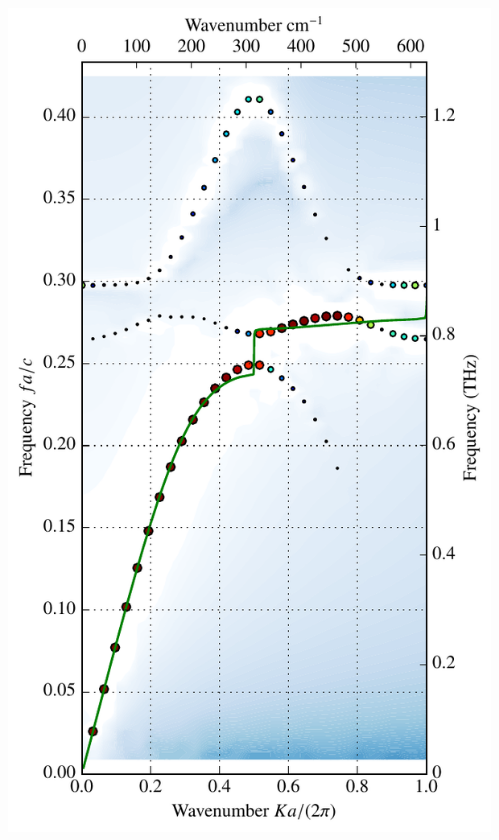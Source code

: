 \documentclass[t]{beamer} \usepackage[english]{babel} \usepackage[utf8]{inputenc} \usetheme{Frankfurt} %
\begin{document}
\begin{frame}[plain]{}
\begin{columns}[T]
\begin{column}{.55\textwidth}
	\end{column}%
	\begin{column}{.45\textwidth}
		\vspace{-1mm}\includegraphics[height=\paperheight]{../img-cdh-new/CDH_SRRArray_10.pdf} 
	\end{column}
\end{columns}
\end{frame} 		%
\end{document}
